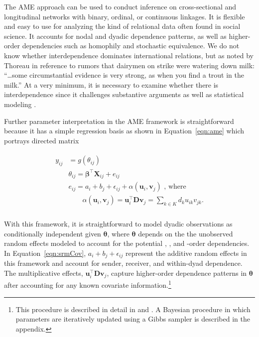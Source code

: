 The AME approach can be used to conduct inference on cross-sectional and longitudinal networks with binary, ordinal, or continuous linkages. It is flexible and easy to use for analyzing the kind of relational data often found in social science. It accounts for nodal and dyadic dependence patterns, as well as higher-order dependencies such as homophily and stochastic equivalence.  We do not know whether interdependence dominates international relations, but as noted by Thoreau in reference to rumors that dairymen on strike were watering down milk: ``\ldots some circumstantial evidence is very strong, as when you find a trout in the milk.'' At a very minimum, it is necessary to examine whether there is interdependence since it challenges substantive arguments as well as statistical modeling \citep{snijders:2011}. 

Further parameter interpretation in the AME framework is straightforward because it has a simple regression basis as shown in Equation~\ref{eqn:ame} which portrays directed matrix \:

\begin{align}
\begin{aligned}
	y_{ij} &= g(\theta_{ij}) \\
	&\theta_{ij} = \bm\beta^{\top} \mathbf{X}_{ij} + e_{ij} \\
	&e_{ij} = a_{i} + b_{j}  + \epsilon_{ij} + \alpha(\textbf{u}_{i}, \textbf{v}_{j}) \text{  , where } \\
	&\qquad \alpha(\textbf{u}_{i}, \textbf{v}_{j}) = \textbf{u}_{i}^{\top} \textbf{D} \textbf{v}_{j} = \sum_{k \in K} d_{k} u_{ik} v_{jk}. \\
\label{eqn:ame}
\end{aligned}
\end{align}

With this framework, it is straightforward to model dyadic observations as conditionally independent given $\bm\theta$, where $\bm\theta$ depends on the the unobserved random effects modeled to account for the potential \first, \second, and \third-order dependencies. In Equation~\ref{eqn:srmCov}, $a_{i} + b_{j}  + \epsilon_{ij}$ represent the additive random effects in this framework and account for sender, receiver, and within-dyad dependence. The multiplicative effects, $\textbf{u}_{i}^{\top} \textbf{D} \textbf{v}_{j}$, capture higher-order dependence patterns in $\bm\theta$ after accounting for any known covariate information.\footnote{This procedure is described in detail in \citet{hoff:2008} and \citet{minhas:etal:2016:arxiv}. A Bayesian procedure in which parameters are iteratively updated using a Gibbs sampler is described in the appendix.}
